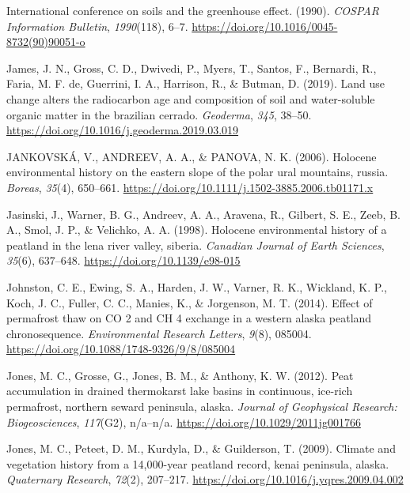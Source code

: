 \documentclass[]{article}
\begin{document}
\leavevmode\hypertarget{ref-1990}{}%
International conference on soils and the greenhouse effect. (1990).
\emph{COSPAR Information Bulletin}, \emph{1990}(118), 6--7.
\url{https://doi.org/10.1016/0045-8732(90)90051-o}

\leavevmode\hypertarget{ref-James_2019}{}%
James, J. N., Gross, C. D., Dwivedi, P., Myers, T., Santos, F.,
Bernardi, R., Faria, M. F. de, Guerrini, I. A., Harrison, R., \& Butman,
D. (2019). Land use change alters the radiocarbon age and composition of
soil and water-soluble organic matter in the brazilian cerrado.
\emph{Geoderma}, \emph{345}, 38--50.
\url{https://doi.org/10.1016/j.geoderma.2019.03.019}

\leavevmode\hypertarget{ref-JANKOVSK__2006}{}%
JANKOVSKÁ, V., ANDREEV, A. A., \& PANOVA, N. K. (2006). Holocene
environmental history on the eastern slope of the polar ural mountains,
russia. \emph{Boreas}, \emph{35}(4), 650--661.
\url{https://doi.org/10.1111/j.1502-3885.2006.tb01171.x}

\leavevmode\hypertarget{ref-Jasinski_1998}{}%
Jasinski, J., Warner, B. G., Andreev, A. A., Aravena, R., Gilbert, S.
E., Zeeb, B. A., Smol, J. P., \& Velichko, A. A. (1998). Holocene
environmental history of a peatland in the lena river valley, siberia.
\emph{Canadian Journal of Earth Sciences}, \emph{35}(6), 637--648.
\url{https://doi.org/10.1139/e98-015}

\leavevmode\hypertarget{ref-Johnston_2014}{}%
Johnston, C. E., Ewing, S. A., Harden, J. W., Varner, R. K., Wickland,
K. P., Koch, J. C., Fuller, C. C., Manies, K., \& Jorgenson, M. T.
(2014). Effect of permafrost thaw on CO 2 and CH 4 exchange in a western
alaska peatland chronosequence. \emph{Environmental Research Letters},
\emph{9}(8), 085004. \url{https://doi.org/10.1088/1748-9326/9/8/085004}

\leavevmode\hypertarget{ref-Jones_2012}{}%
Jones, M. C., Grosse, G., Jones, B. M., \& Anthony, K. W. (2012). Peat
accumulation in drained thermokarst lake basins in continuous, ice-rich
permafrost, northern seward peninsula, alaska. \emph{Journal of
Geophysical Research: Biogeosciences}, \emph{117}(G2), n/a--n/a.
\url{https://doi.org/10.1029/2011jg001766}

\leavevmode\hypertarget{ref-Jones_2009}{}%
Jones, M. C., Peteet, D. M., Kurdyla, D., \& Guilderson, T. (2009).
Climate and vegetation history from a 14,000-year peatland record, kenai
peninsula, alaska. \emph{Quaternary Research}, \emph{72}(2), 207--217.
\url{https://doi.org/10.1016/j.yqres.2009.04.002}
\end{document}
